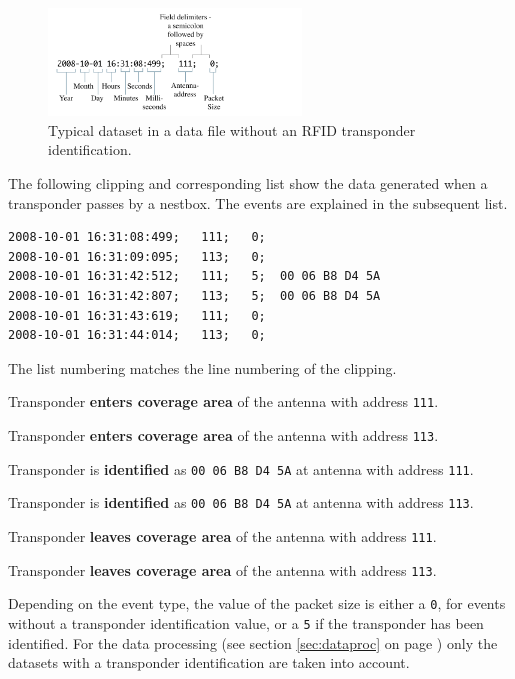 \begin{figure}[!htbp]	
\centering	
\includegraphics[width=0.6\textwidth]{assets/pdf/dataset_no_data.pdf}	
\caption[Dataset without RFID transponder identification]{Typical dataset in a data file without an RFID transponder identification.}
\label{fig:dataset_no_data}
\end{figure}

The following clipping and corresponding list show the data generated when a transponder passes by a nestbox. The events are explained in the subsequent list.  

\numcodestyle
\begin{lstlisting}[frame=none]
2008-10-01 16:31:08:499;   111;   0; 
2008-10-01 16:31:09:095;   113;   0; 
2008-10-01 16:31:42:512;   111;   5;  00 06 B8 D4 5A
2008-10-01 16:31:42:807;   113;   5;  00 06 B8 D4 5A
2008-10-01 16:31:43:619;   111;   0; 
2008-10-01 16:31:44:014;   113;   0;
\end{lstlisting}

The list numbering matches the line numbering of the clipping.  

\begin{condensed_enum}
  \item Transponder \textbf{enters coverage area} of the antenna with address \lstinline|111|.
  \item Transponder \textbf{enters coverage area} of the antenna with address \lstinline|113|.
  \item Transponder is \textbf{identified} as \lstinline|00 06 B8 D4 5A| at antenna with address \lstinline|111|.
  \item Transponder is \textbf{identified} as \lstinline|00 06 B8 D4 5A| at antenna with address \lstinline|113|.
  \item Transponder \textbf{leaves coverage area} of the antenna with address \lstinline|111|.
  \item Transponder \textbf{leaves coverage area} of the antenna with address \lstinline|113|. 
\end{condensed_enum}

Depending on the event type, the value of the packet size is either a \lstinline|0|, for events without a transponder identification value, or a \lstinline|5| if the transponder has been identified. For the data processing (see section \ref{sec:dataproc} on page \pageref{sec:dataproc}) only the datasets with a transponder identification are taken into account.

